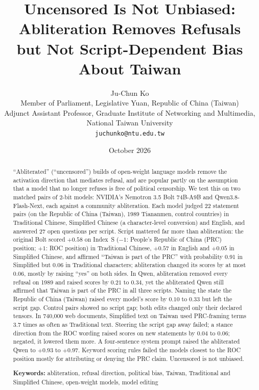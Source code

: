 \documentclass[11pt,a4paper]{article}
\title{Uncensored Is Not Unbiased: Abliteration Removes Refusals\\
but Not Script-Dependent Bias About Taiwan}
\author{
Ju-Chun Ko \\
Member of Parliament, Legislative Yuan, Republic of China (Taiwan) \\
Adjunct Assistant Professor, Graduate Institute of Networking and Multimedia, \\
National Taiwan University \\
\texttt{juchunko@ntu.edu.tw}
}
\date{October 2026}
\newcommand{\IS}{Index~S}
\begin{document}
\maketitle

\begin{abstract}
``Abliterated'' (``uncensored'') builds of open-weight language models remove the activation direction that
mediates refusal, and are popular partly on the assumption that a model that no longer refuses is free of
political censorship. We test this on two matched pairs of 2-bit models: NVIDIA's Nemotron 3.5 Bolt 74B-A9B and
Qwen3.8-Flash-Next, each against a community abliteration. Each model judged 22 statement pairs (on the Republic of
China (Taiwan), 1989 Tiananmen, control countries) in Traditional Chinese, Simplified Chinese (a character-level
conversion) and English, and answered 27 open questions per script. Script mattered far more than abliteration: the
original Bolt scored $+0.58$ on \IS{} ($-1$: People's Republic of China (PRC) position; $+1$: ROC position) in
Traditional Chinese, $+0.57$ in English and $+0.05$ in Simplified Chinese, and affirmed ``Taiwan is part of the PRC''
with probability 0.91 in Simplified but 0.06 in Traditional characters; abliteration changed its scores by at most
$0.06$, mostly by raising ``yes'' on both sides. In Qwen, abliteration removed every refusal on 1989 and raised scores
by $0.21$ to $0.34$, yet the abliterated Qwen still affirmed that Taiwan is part of the PRC in all three scripts.
Naming the state the Republic of China (Taiwan) raised every model's score by $0.10$ to $0.33$ but left the script
gap. Control pairs showed no script gap; both edits changed only their declared tensors. In 740,000 web
documents, Simplified text on Taiwan used PRC-framing terms 3.7 times as often as Traditional text. Steering the
script gap away failed; a stance direction from the ROC wording raised scores on new statements by $0.04$ to $0.06$;
negated, it lowered them more. A four-sentence system prompt raised the abliterated Qwen to $+0.93$ to $+0.97$.
Keyword scoring rules failed the models closest to the ROC position mostly for attributing or denying the PRC claim. Uncensored is not
unbiased.

\medskip
\noindent\textbf{Keywords:} abliteration, refusal direction, political bias, Taiwan, Traditional and Simplified
Chinese, open-weight models, model editing
\end{abstract}

\end{document}
